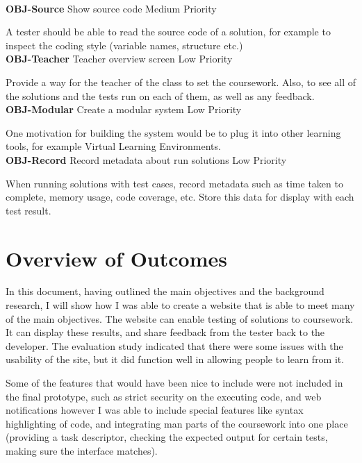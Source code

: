 \documentclass[a4paper,11pt]{report}
\newcommand{\objitem}[4]{\textbf{\\OBJ-#1} \quad #2 \hfill #3\par#4}
\begin{document}
\objitem{Source}{Show source code}{Medium Priority}{A tester should be able to read the source code of a solution, for example to inspect the coding style (variable names, structure etc.)}
\objitem{Teacher}{Teacher overview screen}{Low Priority}{Provide a way for the teacher of the class to set the coursework. Also, to see all of the solutions and the tests run on each of them, as well as any feedback.}
\objitem{Modular}{Create a modular system}{Low Priority}{One motivation for building the system would be to plug it into other learning tools, for example Virtual Learning Environments.}
\objitem{Record}{Record metadata about run solutions}{Low Priority}{When running solutions with test cases, record metadata such as time taken to complete, memory usage, code coverage, etc. Store this data for display with each test result.}

\section{Overview of Outcomes}
In this document, having outlined the main objectives and the background research, I will show how I was able to create a website that is able to meet many of the main objectives. The website can enable testing of solutions to coursework. It can display these results, and share feedback from the tester back to the developer. The evaluation study indicated that there were some issues with the usability of the site, but it did function well in allowing people to learn from it.\par
Some of the features that would have been nice to include were not included in the final prototype, such as strict security on the executing code, and web notifications however I was able to include special features like syntax highlighting of code, and integrating man parts of the coursework into one place (providing a task descriptor, checking the expected output for certain tests, making sure the interface matches).
\end{document}
